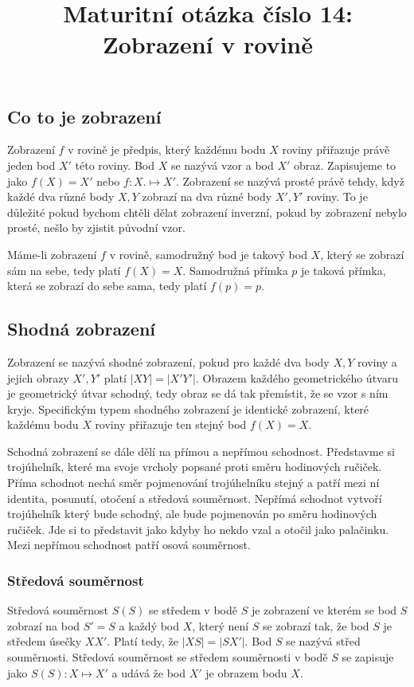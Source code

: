 \documentclass[12pt]{article}
\title{Maturitní otázka číslo 14: Zobrazení v rovině}
\author{}
\date{}
\begin{document}
\maketitle

\subsection*{Co to je zobrazení}
Zobrazení $f$ v rovině je předpis, který každému bodu $X$ roviny přiřazuje právě jeden bod $X'$ této
roviny. Bod $X$ se nazývá vzor a bod $X'$ obraz. Zapisujeme to jako $f(X) = X'$ nebo $f : X.
\mapsto X'$. Zobrazení se nazývá prosté právě tehdy, když každé dva různé body $X, Y$ zobrazí na dva
různé body $X', Y'$ roviny. To je důležité pokud bychom chtěli dělat zobrazení inverzní, pokud by
zobrazení nebylo prosté, nešlo by zjistit původní vzor.

Máme-li zobrazení $f$ v rovině, samodružný bod je takový bod $X$, který se zobrazí sám na sebe, tedy
platí $f(X) = X$. Samodružná přímka $p$ je taková přímka, která se zobrazí do sebe sama, tedy platí
$f(p) = p$.

\subsection*{Shodná zobrazení}
Zobrazení se nazývá shodné zobrazení, pokud pro každé dva body $X, Y$ roviny a jejich obrazy $X', Y'$
platí $|XY| = |X'Y'|$. Obrazem každého geometrického útvaru je geometrický útvar schodný, tedy obraz
se dá tak přemístit, že se vzor s ním kryje. Specifickým typem shodného zobrazení je identické
zobrazení, které každému bodu $X$ roviny přiřazuje ten stejný bod $f(X) = X$.

Schodná zobrazení se dále dělí na přímou a nepřímou schodnost. Představme si trojúhelník, které ma
svoje vrcholy popsané proti směru hodinových ručiček. Příma schodnot nechá směr pojmenování
trojúhelníku stejný a patří mezi ní identita, posunutí, otočení a středová souměrnost. Nepřímá
schodnot vytvoří trojúhelník který bude schodný, ale bude pojmenován po směru hodinových ručiček. Jde
si to představit jako kdyby ho nekdo vzal a otočil jako palačinku. Mezi nepřímou schodnost patří
osová souměrnost.
\subsubsection*{Středová souměrnost}
Středová souměrnost $S(S)$ se středem v bodě $S$ je zobrazení ve kterém se bod $S$ zobrazí na bod
$S' = S$ a každý bod $X$, který není $S$ se zobrazí tak, že bod $S$ je středem úsečky $XX'$. Platí
tedy, že $|XS| = |SX'|$. Bod $S$ se nazývá střed souměrnosti. Středová souměrnost se středem
souměrnosti v bodě $S$ se zapisuje jako $S(S) : X \mapsto X'$ a udává že bod $X'$ je obrazem bodu $X$.
\end{document}
